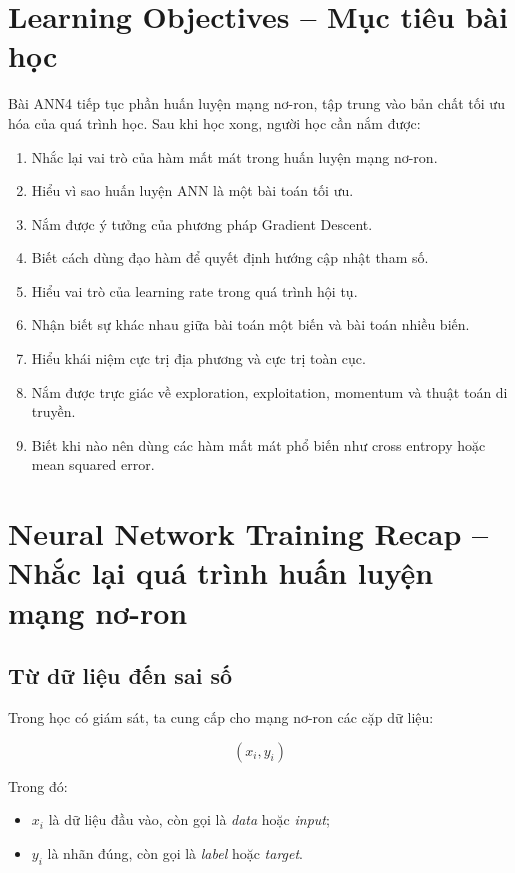

\section*{Learning Objectives -- Mục tiêu bài học}

Bài ANN4 tiếp tục phần huấn luyện mạng nơ-ron, tập trung vào bản chất tối ưu hóa của quá trình học. Sau khi học xong, người học cần nắm được:

\begin{enumerate}[label=\arabic*.]
    \item Nhắc lại vai trò của hàm mất mát trong huấn luyện mạng nơ-ron.
    \item Hiểu vì sao huấn luyện ANN là một bài toán tối ưu.
    \item Nắm được ý tưởng của phương pháp Gradient Descent.
    \item Biết cách dùng đạo hàm để quyết định hướng cập nhật tham số.
    \item Hiểu vai trò của learning rate trong quá trình hội tụ.
    \item Nhận biết sự khác nhau giữa bài toán một biến và bài toán nhiều biến.
    \item Hiểu khái niệm cực trị địa phương và cực trị toàn cục.
    \item Nắm được trực giác về exploration, exploitation, momentum và thuật toán di truyền.
    \item Biết khi nào nên dùng các hàm mất mát phổ biến như cross entropy hoặc mean squared error.
\end{enumerate}

\section{Neural Network Training Recap -- Nhắc lại quá trình huấn luyện mạng nơ-ron}

\subsection{Từ dữ liệu đến sai số}

Trong học có giám sát, ta cung cấp cho mạng nơ-ron các cặp dữ liệu:

\[
    (x_i, y_i)
\]

Trong đó:

\begin{itemize}
    \item $x_i$ là dữ liệu đầu vào, còn gọi là \textit{data} hoặc \textit{input};
    \item $y_i$ là nhãn đúng, còn gọi là \textit{label} hoặc \textit{target}.
\end{itemize}

